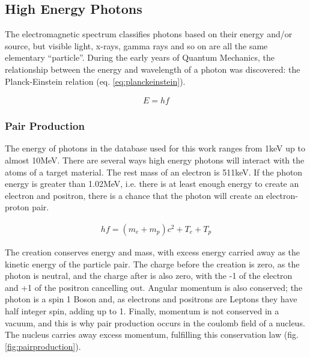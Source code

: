 \FloatBarrier
\subsection{High Energy Photons}

The electromagnetic spectrum classifies photons based on their energy and/or source, but visible light, x-rays, gamma rays and so on are all the same elementary \enquote{particle}.  During the early years of Quantum Mechanics, the relationship between the energy and wavelength of a photon was discovered: the Planck-Einstein relation (eq. \ref{eq:planckeinstein}).

\begin{equation}
\begin{split}
E = h f
\end{split}
\label{eq:planckeinstein}
\end{equation}

\subsubsection{Pair Production}

The energy of photons in the database used for this work ranges from 1keV up to almost 10MeV.  There are several ways high energy photons will interact with the atoms of a target material.  The rest mass of an electron is 511keV.  If the photon energy is greater than 1.02MeV, i.e. there is at least enough energy to create an electron and positron, there is a chance that the photon will create an electron-proton pair.  

\begin{equation}
\begin{split}
h f = (m_e + m_p) c^2 + T_e + T_p
\end{split}
\end{equation}

The creation conserves energy and mass, with excess energy carried away as the kinetic energy of the particle pair.  The charge before the creation is zero, as the photon is neutral, and the charge after is also zero, with the -1 of the electron and +1 of the positron cancelling out.  Angular momentum is also conserved; the photon is a spin 1 Boson and, as electrons and positrons are Leptons they have half integer spin, adding up to 1.  Finally, momentum is not conserved in a vacuum, and this is why pair production occurs in the coulomb field of a nucleus.  The nucleus carries away excess momentum, fulfilling this conservation law (fig. \ref{fig:pairproduction}).

